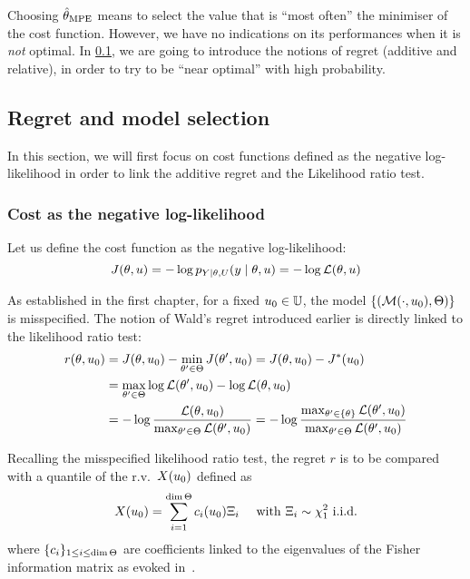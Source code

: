 \documentclass[../../Main_ManuscritThese.tex]{subfiles}
\begin{document}
Choosing $\hat{\theta}_{\mathrm{MPE}}$ means to select the value that is ``most often'' the minimiser of the cost function. However, we have no indications on its performances when it is \emph{not} optimal. In \cref{sec:regret}, we are going to introduce the notions of regret (additive and relative), in order to try to be ``near optimal'' with high probability.


\subsection{Regret and model selection}
\label{sec:regret}
In this section, we will first focus on cost functions defined as the negative log-likelihood in order to link the additive regret and the Likelihood ratio test.
\subsubsection{Cost as the negative log-likelihood}

Let us define the cost function as the negative log-likelihood:
\begin{equation}
  J(\theta, u) = - \log p_{Y\mid \theta, U}(y \mid \theta, u) = -\log \mathcal{L}(\theta,u)
\end{equation}

As established in the first chapter, for a fixed $u_0\in\mathbb{U}$, the model $\left\{\left(\mathcal{M}(\cdot, u_0), \Theta \right)\right\}$ is misspecified.
  The notion of Wald's regret introduced earlier is directly linked to the likelihood ratio test:
  \begin{align}
    r(\theta,u_0) &= J(\theta, u_0) - \min_{\theta^{\prime}\in\Theta}J(\theta^{\prime}, u_0) = J(\theta,u_0) - J^*(u_0)  \\
                 &= \max_{\theta^{\prime}\in\Theta} \log \mathcal{L}(\theta^{\prime}, u_0) - \log \mathcal{L}(\theta, u_0) \\
                 &= -\log \frac{\mathcal{L}(\theta, u_0)}{\max_{\theta^{\prime}\in\Theta}\mathcal{L}(\theta^{\prime}, u_0)} = -\log \frac{\max_{\theta^{\prime}\in\{\theta\}}\mathcal{L}(\theta^{\prime}, u_0)}{\max_{\theta^{\prime}\in\Theta}\mathcal{L}(\theta^{\prime}, u_0)}
  \end{align}

  Recalling the misspecified likelihood ratio test, the regret $r$ is to be compared with a quantile of the r.v.\ $X(u_0)$ defined as
  \begin{equation}
    \label{eq:sumchi2}
X(u_0)=\sum_{i=1}^{\dim \Theta} c_i(u_0) \Xi_i \quad \text{ with } \Xi_i \sim \chi^2_1 \text{ i.i.d.}
\end{equation}
 where $\{c_i\}_{1\leq i \leq \dim \Theta}$ are coefficients linked to the eigenvalues of the Fisher information matrix as evoked in~\label{sec:model_misspecification}.
\end{document}
